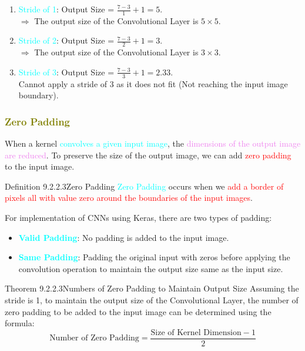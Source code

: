 \documentclass{book}
\begin{document}
\begin{enumerate}
    \item \textcolor{cyan}{Stride of 1}: Output Size = $\frac{7 - 3}{1} + 1 = 5$.\\
    $\Rightarrow$ The output size of the Convolutional Layer is $5 \times 5$.
    \item \textcolor{cyan}{Stride of 2}: Output Size = $\frac{7 - 3}{2} + 1 = 3$.\\
    $\Rightarrow$ The output size of the Convolutional Layer is $3 \times 3$.
    \item \textcolor{cyan}{Stride of 3}: Output Size = $\frac{7 - 3}{3} + 1 = 2.33$.\\
    Cannot apply a stride of 3 as it does not fit (Not reaching the input image boundary).
\end{enumerate}
\textcolor{olive}{\subsubsection{Zero Padding}}
When a kernel \textcolor{cyan}{convolves a given input image}, the \textcolor{violet}{dimensions of the output image are reduced}.
To preserve the size of the output image, we can add \textcolor{red}{zero padding} to the input image.\\
\begin{defBox}{Definition 9.2.2.3}{Zero Padding}
    \textcolor{cyan}{Zero Padding} occurs when we \textcolor{red}{add a border of pixels all with value zero around the boundaries of the input images}.
\end{defBox}
\newpage
For implementation of CNNs using Keras, there are two types of padding:
\begin{itemize}
    \item \textcolor{cyan}{\textbf{Valid Padding}}: No padding is added to the input image.
    \item \textcolor{cyan}{\textbf{Same Padding}}: Padding the original input with zeros before applying the convolution operation to maintain the output size same as the input size.
\end{itemize}
\begin{thmBox}{Theorem 9.2.2.3}{Numbers of Zero Padding to Maintain Output Size}
    Assuming the stride is 1, to maintain the output size of the Convolutional Layer, the number of zero padding to be added to the input image can be determined using the formula:
    \[
        \text{Number of Zero Padding} = \frac{\text{Size of Kernel Dimension} - 1}{2}
    \]
\end{thmBox}
\end{document}
